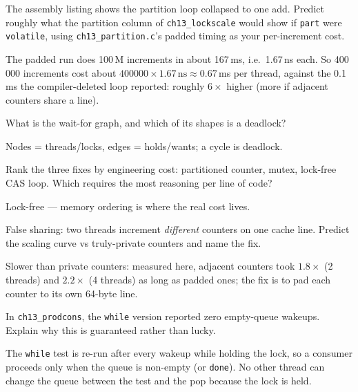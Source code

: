 \begin{exercise}[hard]
The assembly listing shows the partition loop collapsed to one add.
Predict roughly what the partition column of \texttt{ch13\_lockscale}
would show if \texttt{part} were \texttt{volatile}, using
\texttt{ch13\_partition.c}'s padded timing as your per-increment cost.
\end{exercise}
\begin{solution}[hint]
The padded run does 100\,M increments in about 167\,ms, i.e.\ 1.67\,ns
each. So 400\,000 increments cost about $400000\times1.67\,\text{ns}
\approx0.67$\,ms per thread, against the 0.1\,ms the compiler-deleted
loop reported: roughly $6\times$ higher (more if adjacent counters
share a line).
\end{solution}

\begin{exercise}[easy]
What is the wait-for graph, and which of its shapes is a deadlock?
\end{exercise}
\begin{solution}[hint]
Nodes = threads/locks, edges = holds/wants; a cycle is deadlock.
\end{solution}

\begin{exercise}[medium]
Rank the three fixes by engineering cost: partitioned counter,
mutex, lock-free CAS loop. Which requires the most reasoning per
line of code?
\end{exercise}
\begin{solution}[hint]
Lock-free --- memory ordering is where the real cost lives.
\end{solution}

\begin{exercise}[medium]
False sharing: two threads increment \emph{different} counters on
one cache line. Predict the scaling curve vs truly-private counters
and name the fix.
\end{exercise}
\begin{solution}[hint]
Slower than private counters: measured here, adjacent counters took
$1.8\times$ (2 threads) and $2.2\times$ (4 threads) as long as padded
ones; the fix is to pad each counter to its own 64-byte line.
\end{solution}

\begin{exercise}[easy]
In \texttt{ch13\_prodcons}, the \texttt{while} version reported zero
empty-queue wakeups. Explain why this is guaranteed rather
than lucky.
\end{exercise}
\begin{solution}[hint]
The \texttt{while} test is re-run after every wakeup while holding
the lock, so a consumer proceeds only when the queue is non-empty (or
\texttt{done}). No other thread can change the queue between the test
and the pop because the lock is held.
\end{solution}


